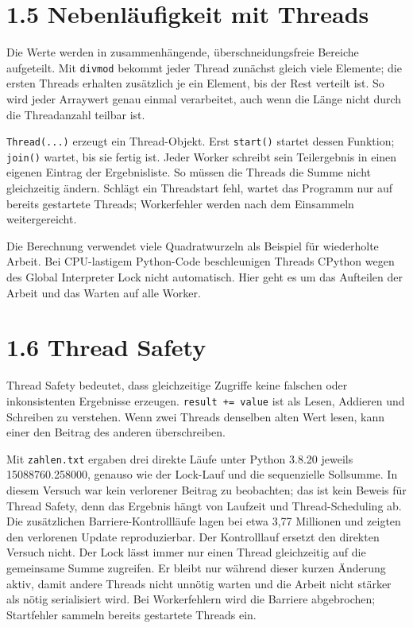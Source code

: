 \documentclass[10pt,a4paper]{article}
\begin{document}
\section*{1.5 Nebenläufigkeit mit Threads}

Die Werte werden in zusammenhängende, überschneidungsfreie Bereiche aufgeteilt. Mit \texttt{divmod} bekommt jeder Thread zunächst gleich viele Elemente; die ersten Threads erhalten zusätzlich je ein Element, bis der Rest verteilt ist. So wird jeder Arraywert genau einmal verarbeitet, auch wenn die Länge nicht durch die Threadanzahl teilbar ist.

\texttt{Thread(...)} erzeugt ein Thread-Objekt. Erst \texttt{start()} startet dessen Funktion; \texttt{join()} wartet, bis sie fertig ist. Jeder Worker schreibt sein Teilergebnis in einen eigenen Eintrag der Ergebnisliste. So müssen die Threads die Summe nicht gleichzeitig ändern. Schlägt ein Threadstart fehl, wartet das Programm nur auf bereits gestartete Threads; Workerfehler werden nach dem Einsammeln weitergereicht.

Die Berechnung verwendet viele Quadratwurzeln als Beispiel für wiederholte Arbeit. Bei CPU-lastigem Python-Code beschleunigen Threads CPython wegen des Global Interpreter Lock nicht automatisch. Hier geht es um das Aufteilen der Arbeit und das Warten auf alle Worker.

\section*{1.6 Thread Safety}

Thread Safety bedeutet, dass gleichzeitige Zugriffe keine falschen oder inkonsistenten Ergebnisse erzeugen. \texttt{result += value} ist als Lesen, Addieren und Schreiben zu verstehen. Wenn zwei Threads denselben alten Wert lesen, kann einer den Beitrag des anderen überschreiben.

Mit \texttt{zahlen.txt} ergaben drei direkte Läufe unter Python 3.8.20 jeweils 15088760.258000, genauso wie der Lock-Lauf und die sequenzielle Sollsumme. In diesem Versuch war kein verlorener Beitrag zu beobachten; das ist kein Beweis für Thread Safety, denn das Ergebnis hängt von Laufzeit und Thread-Scheduling ab. Die zusätzlichen Barriere-Kontrollläufe lagen bei etwa 3,77 Millionen und zeigten den verlorenen Update reproduzierbar. Der Kontrolllauf ersetzt den direkten Versuch nicht. Der Lock lässt immer nur einen Thread gleichzeitig auf die gemeinsame Summe zugreifen. Er bleibt nur während dieser kurzen Änderung aktiv, damit andere Threads nicht unnötig warten und die Arbeit nicht stärker als nötig serialisiert wird. Bei Workerfehlern wird die Barriere abgebrochen; Startfehler sammeln bereits gestartete Threads ein.
\end{document}

